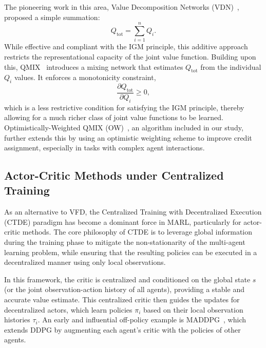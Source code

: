 The pioneering work in this area, Value Decomposition Networks (VDN)~\cite{sunehagValueDecompositionNetworksCooperative2017}, proposed a simple summation:
\begin{equation}
    Q_{\text{tot}} = \sum_{i=1}^{n} Q_i.
    \label{eq:Qtot=Qi}
\end{equation}
While effective and compliant with the IGM principle, this additive approach restricts the representational capacity of the joint value function. Building upon this, QMIX~\cite{rashidQMIXMonotonicValue2018} introduces a mixing network that estimates $Q_{\text{tot}}$ from the individual $Q_i$ values. It enforces a monotonicity constraint,
\begin{equation}
    \frac{\partial Q_{\text{tot}}}{\partial Q_i} \ge 0,
    \label{eq:partial_derivative_condition}
\end{equation}
which is a less restrictive condition for satisfying the IGM principle, thereby allowing for a much richer class of joint value functions to be learned. Optimistically-Weighted QMIX (OW)~\cite{rashidWeightedQMIXExpanding2020}, an algorithm included in our study, further extends this by using an optimistic weighting scheme to improve credit assignment, especially in tasks with complex agent interactions.

\subsection{Actor-Critic Methods under Centralized Training}

As an alternative to VFD, the Centralized Training with Decentralized Execution (CTDE) paradigm has become a dominant force in MARL, particularly for actor-critic methods. The core philosophy of CTDE is to leverage global information during the training phase to mitigate the non-stationarity of the multi-agent learning problem, while ensuring that the resulting policies can be executed in a decentralized manner using only local observations.

In this framework, the critic is centralized and conditioned on the global state $s$ (or the joint observation-action history of all agents), providing a stable and accurate value estimate. This centralized critic then guides the updates for decentralized actors, which learn policies $\pi_i$ based on their local observation histories $\tau_i$. An early and influential off-policy example is MADDPG~\cite{loweMultiAgentActorCriticMixed2020}, which extends DDPG by augmenting each agent's critic with the policies of other agents.

